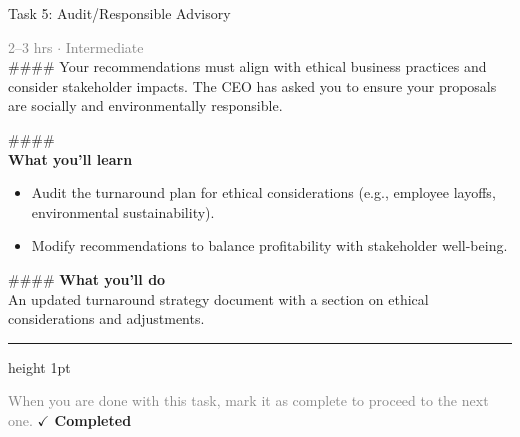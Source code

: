\documentclass[10pt,a4paper]{article}
\begin{document}
\begin{taskbox}{Task 5: Audit/Responsible Advisory}

    {\small \textcolor{gray}{2--3 hrs $\cdot$ Intermediate}}\\[12pt]

    \#\#\#\#   
Your recommendations must align with ethical business practices and consider stakeholder impacts. The CEO has asked you to ensure your proposals are socially and environmentally responsible.  

\#\#\#\# \\[10pt]
\vspace{8pt}
{\large \textbf{\textcolor{brandLight}{What you'll learn}}}\\[4pt]  
\begin{itemize}
    \item Audit the turnaround plan for ethical considerations (e.g., employee layoffs, environmental sustainability).  
    \item Modify recommendations to balance profitability with stakeholder well-being.  
\end{itemize}

\#\#\#\# \vspace{8pt}
{\large \textbf{\textcolor{brandLight}{What you'll do}}}\\[4pt]  
An updated turnaround strategy document with a section on ethical considerations and adjustments.\par

    \vspace{16pt}

    \textcolor{cardBorder}{\hrule height 1pt}\vspace{8pt}

    \small \textcolor{gray}{When you are done with this task, mark it as complete to proceed to the next one.} \hfill \textbf{\textcolor{brandDark}{$\checkmark$ Completed}}

\end{taskbox}
\end{document}
